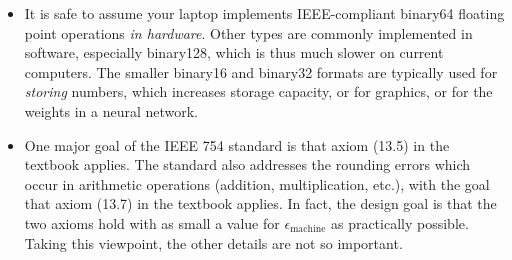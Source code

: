 \documentclass[11pt]{amsart}
\newcommand{\eps}{\epsilon}
\begin{document}
\begin{itemize}
\item It is safe to assume your laptop implements IEEE-compliant binary64 floating point operations \emph{in hardware}.  Other types are commonly implemented in software, especially binary128, which is thus much slower on current computers.  The smaller binary16 and binary32 formats are typically used for \emph{storing} numbers, which increases storage capacity, or for graphics, or for the weights in a neural network.

\item One major goal of the IEEE 754 standard is that axiom (13.5) in the textbook applies.  The standard also addresses the rounding errors which occur in arithmetic operations (addition, multiplication, etc.), with the goal that axiom (13.7) in the textbook applies.  In fact, the design goal is that the two axioms hold with as small a value for $\eps_{\text{machine}}$ as practically possible.  Taking this viewpoint, the other details are not so important.

\end{itemize}
\end{document}
